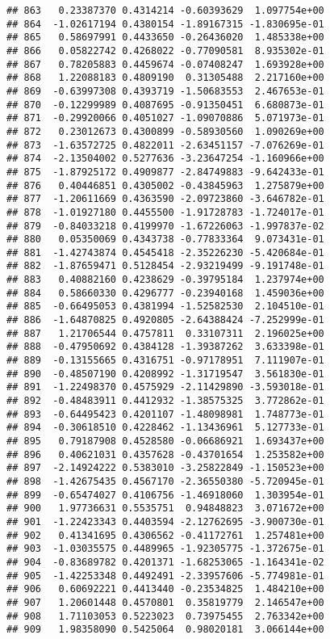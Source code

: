 \documentclass[
]{article}
\begin{document}
\begin{verbatim}
## 863   0.23387370 0.4314214 -0.60393629  1.097754e+00
## 864  -1.02617194 0.4380154 -1.89167315 -1.830695e-01
## 865   0.58697991 0.4433650 -0.26436020  1.485338e+00
## 866   0.05822742 0.4268022 -0.77090581  8.935302e-01
## 867   0.78205883 0.4459674 -0.07408247  1.693928e+00
## 868   1.22088183 0.4809190  0.31305488  2.217160e+00
## 869  -0.63997308 0.4393719 -1.50683553  2.467653e-01
## 870  -0.12299989 0.4087695 -0.91350451  6.680873e-01
## 871  -0.29920066 0.4051027 -1.09070886  5.071973e-01
## 872   0.23012673 0.4300899 -0.58930560  1.090269e+00
## 873  -1.63572725 0.4822011 -2.63451157 -7.076269e-01
## 874  -2.13504002 0.5277636 -3.23647254 -1.160966e+00
## 875  -1.87925172 0.4909877 -2.84749883 -9.642433e-01
## 876   0.40446851 0.4305002 -0.43845963  1.275879e+00
## 877  -1.20611669 0.4363590 -2.09723860 -3.646782e-01
## 878  -1.01927180 0.4455500 -1.91728783 -1.724017e-01
## 879  -0.84033218 0.4199970 -1.67226063 -1.997837e-02
## 880   0.05350069 0.4343738 -0.77833364  9.073431e-01
## 881  -1.42743874 0.4545418 -2.35226230 -5.420684e-01
## 882  -1.87659471 0.5128454 -2.93219499 -9.191748e-01
## 883   0.40882160 0.4238629 -0.39795184  1.237974e+00
## 884   0.58660330 0.4296777 -0.23940168  1.459036e+00
## 885  -0.66495053 0.4381994 -1.52582530  2.104510e-01
## 886  -1.64870825 0.4920805 -2.64388424 -7.252999e-01
## 887   1.21706544 0.4757811  0.33107311  2.196025e+00
## 888  -0.47950692 0.4384128 -1.39387262  3.633398e-01
## 889  -0.13155665 0.4316751 -0.97178951  7.111907e-01
## 890  -0.48507190 0.4208992 -1.31719547  3.561830e-01
## 891  -1.22498370 0.4575929 -2.11429890 -3.593018e-01
## 892  -0.48483911 0.4412932 -1.38575325  3.772862e-01
## 893  -0.64495423 0.4201107 -1.48098981  1.748773e-01
## 894  -0.30618510 0.4228462 -1.13436961  5.127733e-01
## 895   0.79187908 0.4528580 -0.06686921  1.693437e+00
## 896   0.40621031 0.4357628 -0.43701654  1.253582e+00
## 897  -2.14924222 0.5383010 -3.25822849 -1.150523e+00
## 898  -1.42675435 0.4567170 -2.36550380 -5.720945e-01
## 899  -0.65474027 0.4106756 -1.46918060  1.303954e-01
## 900   1.97736631 0.5535751  0.94848823  3.071672e+00
## 901  -1.22423343 0.4403594 -2.12762695 -3.900730e-01
## 902   0.41341695 0.4306562 -0.41172761  1.257481e+00
## 903  -1.03035575 0.4489965 -1.92305775 -1.372675e-01
## 904  -0.83689782 0.4201371 -1.68253065 -1.164341e-02
## 905  -1.42253348 0.4492491 -2.33957606 -5.774981e-01
## 906   0.60692221 0.4413440 -0.23534825  1.484210e+00
## 907   1.20601448 0.4570801  0.35819779  2.146547e+00
## 908   1.71103053 0.5223023  0.73975455  2.763342e+00
## 909   1.98358090 0.5425064  0.98020181  3.066144e+00

\end{verbatim}
\end{document}
